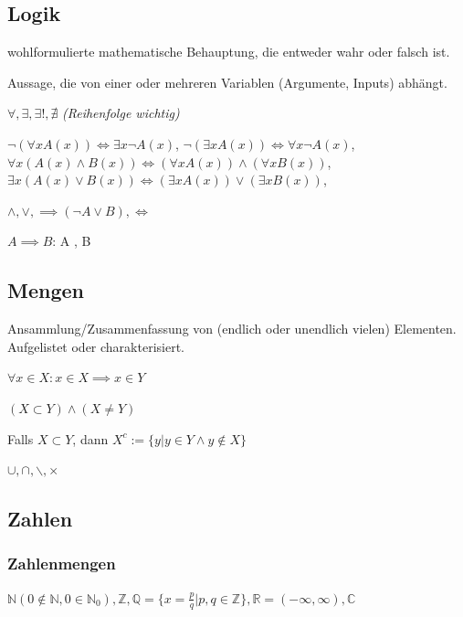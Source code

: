 \subsection{Logik}
 wohlformulierte mathematische Behauptung, die entweder wahr oder falsch ist.

 Aussage, die von einer oder mehreren Variablen (Argumente, Inputs) abhängt.

 $\forall, \exists, \exists!, \nexists$ \textit{(Reihenfolge wichtig)}

 $\lnot (\forall x A(x)) \Leftrightarrow \exists x \lnot A(x)$, 
$\lnot (\exists x A(x)) \Leftrightarrow \forall x \lnot A(x)$,
$\forall x (A(x) \land B(x)) \Leftrightarrow (\forall x A(x)) \land (\forall x B(x))$,
$\exists x (A(x) \lor B(x)) \Leftrightarrow (\exists x A(x)) \lor (\exists x B(x))$,

 $\land, \lor, \implies (\lnot A \lor B), \Leftrightarrow$

$A \implies B$: A , B 


\subsection{Mengen}
Ansammlung/Zusammenfassung von (endlich oder unendlich vielen) Elementen. Aufgelistet oder charakterisiert.

 $\forall x \in X : x \in X \implies x \in Y$

 $(X \subset Y) \land (X \neq Y)$

 Falls $X \subset Y$, dann $X^c := \{y |y \in Y \land y \notin X \}$ 

 $\cup, \cap, \backslash, \times$

\subsection{Zahlen} 

\subsubsection{Zahlenmengen}

$\mathbb{N} (0 \notin \mathbb{N}, 0 \in \mathbb{N}_0), \mathbb{Z}, \mathbb{Q} = \{x = \frac{p}{q} | p,q \in \mathbb{Z}\}, \mathbb{R} = (-\infty, \infty), \mathbb{C}$

